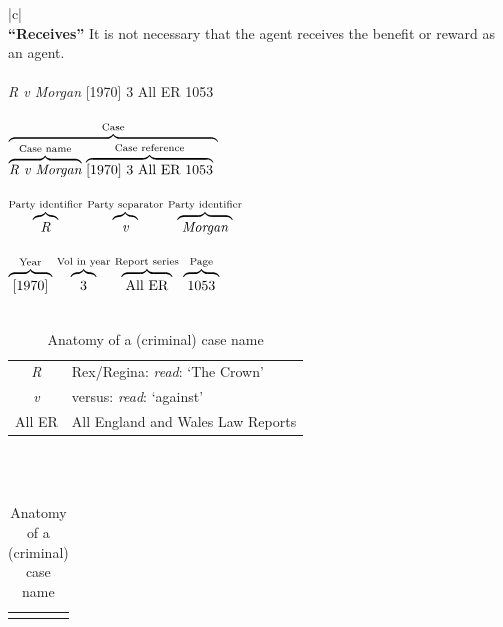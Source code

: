 \begin{table}
\begin{center}
\begin{tabular}{|c|}
\hline \\
\textbf{``Receives''} It is not necessary that the agent \cr receives the benefit or reward as an agent.
\\ \\%
\textit{R v Morgan} [1970] 3 All ER 1053%
\\ \\%
$%
\stackrel{\textrm{Case}}{%
\overbrace{%
\stackrel{\textrm{Case name}}{\overbrace{\textit{R v Morgan}}}\ 
\stackrel{\textrm{Case reference}}{\overbrace{\textrm{[1970] 3 All ER 1053}}}\ 
}}
$%
\\ \\%
$%
\stackrel{\textrm{Party identifier}}{\overbrace{\textit{\phantom{[}R\phantom{[}}}}\ 
\stackrel{\textrm{Party separator}}{\overbrace{\textit{\phantom{[}v\phantom{[}}}}\ 
\stackrel{\textrm{Party identifier}}{\overbrace{\textit{\phantom{[}Morgan\phantom{[}}}}\ 
$%
\\ \\%
$%
\stackrel{\textrm{Year}}{\overbrace{\textrm{\strut\phantom{[}[1970]\phantom{[}}}}\ 
\stackrel{\textrm{Vol in year}}{\overbrace{\textrm{\strut\phantom{[}3\phantom{[}}}}\ 
\stackrel{\textrm{Report series}}{\overbrace{\textrm{\strut\phantom{[}All ER\phantom{[}}}}\ 
\stackrel{\textrm{Page}}{\overbrace{\textrm{\strut\phantom{[}1053\phantom{[}}}}\ 
$%
\\ \\%
\begin{tabular}{cl}
\textit{R} & Rex/Regina: \textit{read}: `The Crown' \\
\textit{v} & versus: \textit{read}: `against' \\
All ER & All England and Wales Law Reports \\
\end{tabular}
\\ \mg \\%
\hline
\end{tabular}
\begin{tabular}{l}
 \lcinline{rmorgan}\\
\end{tabular}
\caption{Anatomy of a (criminal) case name}
\label{tab:crimlaw}
\end{center}
\end{table}

